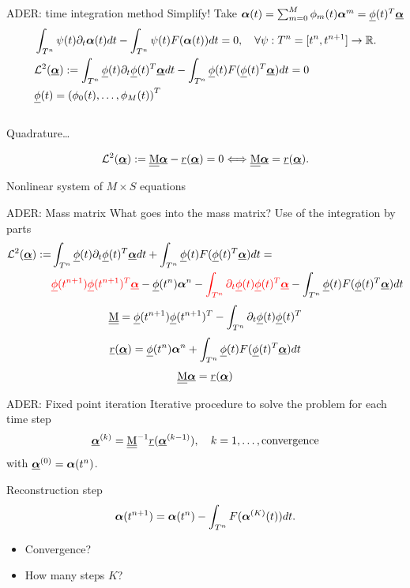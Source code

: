 \documentclass[aspectratio=169]{beamer}
\begin{document}
\begin{frame}{ADER: time integration method}
Simplify!  Take $\bc(t) = \sum_{m=0}^M \phi_m(t) \bc^m = \bphi(t)^T\bbc$
\begin{align*}\label{eq:ADERODEL2}
&\int_{T^n}  \psi(t)\partial_t \bc(t) dt - \int_{T^n} \psi(t)F(\bc(t))  dt = 0, \quad  \forall \psi: T^n=[t^n,t^{n+1}]\to \R.
\\
&\L^2(\bbc ):= \int_{T^n} \bphi(t) \partial_t \bphi(t)^T \bbc dt - \int_{T^n} \bphi(t)  F(\bphi(t)^T\bbc)  dt = 0\\
&\bphi(t) = \left( \phi_0(t), \dots, \phi_M(t) \right)^T
\end{align*}\\

Quadrature\dots

\begin{equation}\label{fix:point}
\L^2(\bbc):=\M\bbc-\vec{r}(\bbc)=0 \Longleftrightarrow  \M \bbc = \vec{r}(\bbc)  .
\end{equation}

Nonlinear system of $M \times S$ equations


\end{frame}
\begin{frame}{ADER: Mass matrix}
	What goes into the mass matrix? Use of the integration by parts
	\begin{align*}
		\L^2(\bbc ):=& \int_{T^n} \bphi(t) \partial_t \bphi(t)^T \bbc dt + \int_{T^n} \bphi(t)  F(\bphi(t)^T\bbc)  dt =\\
		&{\color{red}\bphi(t^{n+1}) \bphi(t^{n+1})^T \bbc} - \bphi(t^{n}) \bc^n -  {\color{red}\int_{T^n} \partial_t \bphi(t) \bphi(t)^T \bbc }  - \int_{T^n} \bphi(t)  F(\bphi(t)^T\bbc)  dt 
	\end{align*}
	$$
	\M = \bphi(t^{n+1}) \bphi(t^{n+1})^T -\int_{T^n} \partial_t \bphi(t) \bphi(t)^T 
	$$
	$$
	\vec{r}(\bbc) =  \bphi(t^{n}) \bc^n + \int_{T^n} \bphi(t)  F(\bphi(t)^T\bbc)  dt 
	$$
$$
\M \bbc = \vec{r}(\bbc)
$$
\end{frame}


\begin{frame}{ADER: Fixed point iteration}
Iterative procedure to solve the problem for each time step
\begin{equation}\label{fix:point}
\bbc^{(k)}=\M^{-1}\vec{r}(\bbc^{(k-1)}),\quad k=1,\dots, \text{convergence}
\end{equation}
with $\bbc^{(0)}=\bc(t^n)$.

Reconstruction step
\begin{equation*}
	\bc(t^{n+1}) = \bc(t^{n}) - \int_{T^n} F(\bc^{(K)}(t))  dt.
\end{equation*}
\begin{itemize}
\item Convergence?
\item How many steps $K$?
\end{itemize}

\end{frame}
\end{document}
